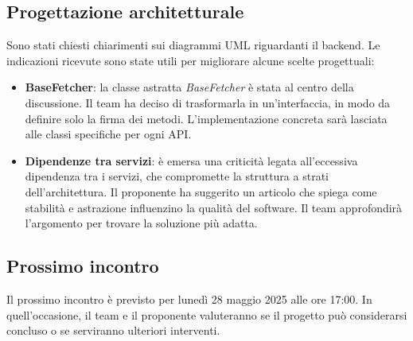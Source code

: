 \subsection{Progettazione architetturale}

Sono stati chiesti chiarimenti sui diagrammi UML riguardanti il backend. Le indicazioni ricevute sono state utili per migliorare alcune scelte progettuali:

\begin{itemize} 
    \item \textbf{BaseFetcher}: la classe astratta \textit{BaseFetcher} è stata al centro della discussione. Il team ha deciso di trasformarla in un’interfaccia, in modo da definire solo la firma dei metodi. L’implementazione concreta sarà lasciata alle classi specifiche per ogni API. 
    \item \textbf{Dipendenze tra servizi}: è emersa una criticità legata all’eccessiva dipendenza tra i servizi, che compromette la struttura a strati dell’architettura. Il proponente ha suggerito un articolo che spiega come stabilità e astrazione influenzino la qualità del software. Il team approfondirà l’argomento per trovare la soluzione più adatta. 
\end{itemize}

\subsection{Prossimo incontro}

Il prossimo incontro è previsto per lunedì 28 maggio 2025 alle ore 17:00. In quell’occasione, il team e il proponente valuteranno se il progetto può considerarsi concluso o se serviranno ulteriori interventi.